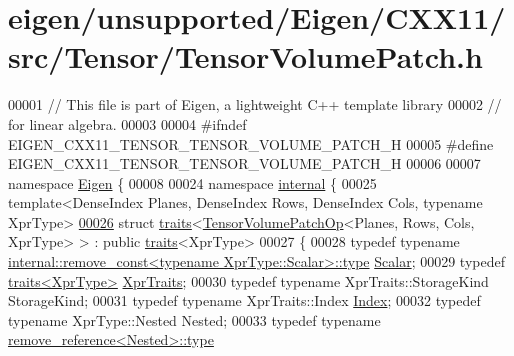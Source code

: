 \hypertarget{eigen_2unsupported_2_eigen_2_c_x_x11_2src_2_tensor_2_tensor_volume_patch_8h_source}{}\section{eigen/unsupported/\+Eigen/\+C\+X\+X11/src/\+Tensor/\+Tensor\+Volume\+Patch.h}
\label{eigen_2unsupported_2_eigen_2_c_x_x11_2src_2_tensor_2_tensor_volume_patch_8h_source}

\begin{DoxyCode}
00001 \textcolor{comment}{// This file is part of Eigen, a lightweight C++ template library}
00002 \textcolor{comment}{// for linear algebra.}
00003 
00004 \textcolor{preprocessor}{#ifndef EIGEN\_CXX11\_TENSOR\_TENSOR\_VOLUME\_PATCH\_H}
00005 \textcolor{preprocessor}{#define EIGEN\_CXX11\_TENSOR\_TENSOR\_VOLUME\_PATCH\_H}
00006 
00007 \textcolor{keyword}{namespace }\hyperlink{namespace_eigen}{Eigen} \{
00008 
00024 \textcolor{keyword}{namespace }\hyperlink{namespaceinternal}{internal} \{
00025 \textcolor{keyword}{template}<DenseIndex Planes, DenseIndex Rows, DenseIndex Cols, \textcolor{keyword}{typename} XprType>
\hyperlink{struct_eigen_1_1internal_1_1traits_3_01_tensor_volume_patch_op_3_01_planes_00_01_rows_00_01_cols_00_01_xpr_type_01_4_01_4}{00026} \textcolor{keyword}{struct }\hyperlink{struct_eigen_1_1internal_1_1traits}{traits}<\hyperlink{class_eigen_1_1_tensor_volume_patch_op}{TensorVolumePatchOp}<Planes, Rows, Cols, XprType> > : \textcolor{keyword}{public} 
      \hyperlink{struct_eigen_1_1internal_1_1traits}{traits}<XprType>
00027 \{
00028   \textcolor{keyword}{typedef} \textcolor{keyword}{typename} \hyperlink{group___sparse_core___module}{internal::remove\_const<typename XprType::Scalar>::type}
       \hyperlink{group___sparse_core___module}{Scalar};
00029   \textcolor{keyword}{typedef} \hyperlink{struct_eigen_1_1internal_1_1traits}{traits<XprType>} \hyperlink{struct_eigen_1_1internal_1_1traits}{XprTraits};
00030   \textcolor{keyword}{typedef} \textcolor{keyword}{typename} XprTraits::StorageKind StorageKind;
00031   \textcolor{keyword}{typedef} \textcolor{keyword}{typename} XprTraits::Index \hyperlink{namespace_eigen_a62e77e0933482dafde8fe197d9a2cfde}{Index};
00032   \textcolor{keyword}{typedef} \textcolor{keyword}{typename} XprType::Nested Nested;
00033   \textcolor{keyword}{typedef} \textcolor{keyword}{typename} \hyperlink{group___sparse_core___module}{remove\_reference<Nested>::type} 

\end{DoxyCode}
